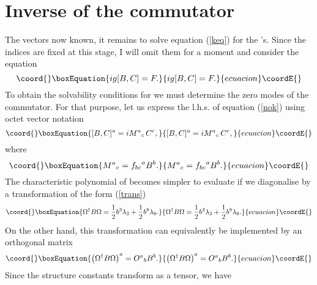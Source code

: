 \documentclass[a4paper,12pt]{article}
\begin{document}
\section{Inverse of the commutator}

The vectors \coordHE{} now known, it remains to solve equation (\ref{keq}) for the \coordHE{}'s. Since the indices \coordHE{} are fixed at this stage, I will omit them for a moment and consider the equation
\begin{equation}\coord{}\boxEquation{\label{nok}
ig [B,C] = F.
}{ig [B,C] = F.
}{ecuacion}\coordE{}\end{equation}
To obtain the solvability conditions for \coordHE{} we must determine the zero modes of the commutator. For that purpose, let us express the l.h.s. of equation (\ref{nok}) using octet vector notation
\begin{equation}\coord{}\boxEquation{\label{adj}
[B,C]^a = i {M^a}_c \, C^c,
}{[B,C]^a = i {M^a}_c \, C^c,
}{ecuacion}\coordE{}\end{equation}
where
\begin{equation}\coord{}\boxEquation{\label{mdef}
{M^a}_c = {f_{bc}}^a B^b.
}{{M^a}_c = {f_{bc}}^a B^b.
}{ecuacion}\coordE{}\end{equation}
The characteristic polynomial of \coordHE{} becomes simpler to evaluate if we diagonalise \coordHE{} by a transformation of the form (\ref{trans})
\begin{equation}\coord{}\boxEquation{\label{diag}
\Omega^{\dagger} B \Omega = \frac{1}{2} b^3 \lambda_3 + \frac{1}{2} b^8 \lambda_8.
}{\Omega^{\dagger} B \Omega = \frac{1}{2} b^3 \lambda_3 + \frac{1}{2} b^8 \lambda_8.
}{ecuacion}\coordE{}\end{equation}
On the other hand, this transformation can equivalently be implemented by an orthogonal \coordHE{} matrix \coordHE{}
\begin{equation}\coord{}\boxEquation{\label{uuu}
\left( \Omega^{\dagger} B \Omega \right)^a = {O^a}_b B^b.
}{\left( \Omega^{\dagger} B \Omega \right)^a = {O^a}_b B^b.
}{ecuacion}\coordE{}\end{equation}
Since the structure constants \coordHE{} transform as a tensor, we have
\end{document}

